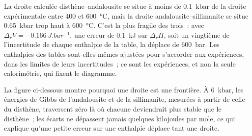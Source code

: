 La droite calculée disthène--andalousite se situe à moins de \qty{0.1}{kbar} de la droite
expérimentale entre 400 et \qty{600}{\celsius}, mais la droite andalousite--sillimanite se situe
\qty{0.65}{kbar} trop haut à \qty{600}{\celsius}. C'est la plus fragile des
trois~: avec $\Delta_r V = \qty{-0.166}{J.bar^{-1}}$, une erreur de \qty{0.1}{kJ} sur
$\Delta_r H$, soit un vingtième de l'incertitude de chaque enthalpie de la table, la déplace de
\qty{600}{bar}. Les enthalpies des tables sont elles-mêmes ajustées pour s'accorder aux
expériences, dans les limites de leurs incertitudes~; ce sont les expériences, et non la seule calorimétrie, qui fixent le
diagramme.

La figure ci-dessous montre pourquoi une droite est une frontière. À \qty{6}{kbar}, les énergies de Gibbs de
l'andalousite et de la sillimanite, mesurées à partir de celle du disthène, traversent zéro là où chacune
deviendrait plus stable que le disthène~; les écarts ne dépassent jamais quelques kilojoules par mole,
ce qui explique qu'une petite erreur sur une enthalpie déplace tant une droite.

\begin{omfigure}
\centering
{}
\par{}
\end{omfigure}


